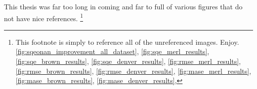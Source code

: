 \label{app:references}
This thesis was far too long in coming and far to full of various figures that do not have nice references.  
	\footnote{This footnote is simply to reference all of the unreferenced images.  Enjoy.
		\ref{fig:sqeonan_improvement_all_dataset},
		\ref{fig:sqe_merl_results},
		\ref{fig:sqe_brown_results},
		\ref{fig:sqe_denver_results},
		\ref{fig:rmse_merl_results},
		\ref{fig:rmse_brown_results},
		\ref{fig:rmse_denver_results},
		\ref{fig:mase_merl_results},
		\ref{fig:mase_brown_results},
		\ref{fig:mase_denver_results},
	}